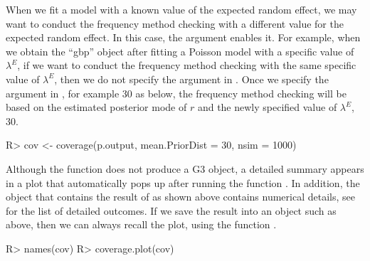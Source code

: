 \documentclass[article]{jss}
\begin{document}
When we fit a model with a known value of the expected random effect, we may want to conduct the frequency method checking with a different value for the expected random effect. In this case, the argument  enables it. For example, when we obtain the ``gbp'' object    after fitting a Poisson model with a specific value of  $\lambda^E$, if we want to conduct the frequency method checking with the same specific value of  $\lambda^E$, then we do not specify the argument  in . Once we specify the argument  in , for example 30 as below, the frequency method checking will be based on the estimated posterior mode of $r$ and the newly specified value of $\lambda^E$, 30.
\begin{CodeChunk}
\begin{CodeInput}
R> cov <- coverage(p.output, mean.PriorDist = 30, nsim = 1000)
\end{CodeInput}
\end{CodeChunk}

Although the function  does not produce a G3 object, a detailed summary appears in a plot that automatically pops up after running the function . In addition, the object  that contains the result of  as shown above contains numerical details, see  for the list of detailed outcomes. If we save the result into an object such as  above, then we can always recall the plot, using the function .
\begin{CodeChunk}
\begin{CodeInput}
R> names(cov)
R> coverage.plot(cov)
\end{CodeInput}
\end{CodeChunk}



\end{document}
